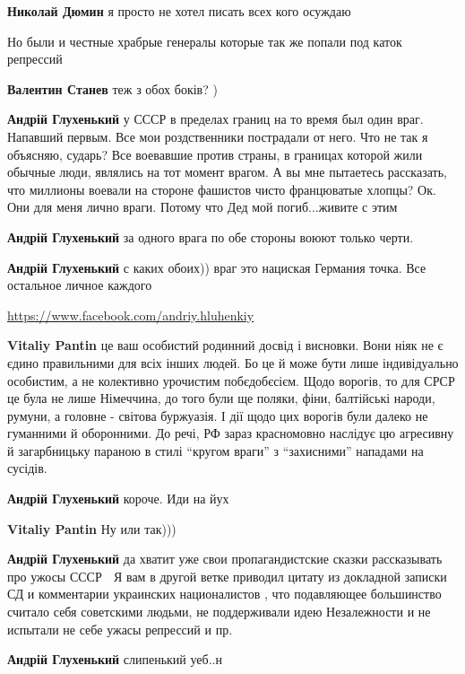\begin{itemize}
\begin{itemize}
\textbf{Николай Дюмин} я просто не хотел писать всех кого осуждаю

Но были и честные храбрые генералы которые так же попали под каток репрессий

\textbf{Валентин Станев} теж з обох боків? )

\textbf{Андрій Глухенький} у СССР в пределах границ на то время был один враг.
Напавший первым. Все мои роздственники пострадали от него. Что не так я
объясняю, сударь? Все воевавшие против страны, в границах которой жили обычные
люди, являлись на тот момент врагом. А вы мне пытаетесь рассказать, что
миллионы воевали на стороне фашистов чисто францюватые хлопцы? Ок. Они для меня
лично враги. Потому что Дед мой погиб...живите с этим

\textbf{Андрій Глухенький} за одного врага по обе стороны воюют только черти.

\textbf{Андрій Глухенький} с каких обоих)) враг это нациская Германия точка. Все остальное личное каждого

\url{https://www.facebook.com/andriy.hluhenkiy}

\textbf{Vitaliy Pantin} це ваш особистий родинний досвід і висновки. Вони ніяк
не є єдино правильними для всіх інших людей. Бо це й може бути лише
індивідуально особистим, а не колективно урочистим побєдобєсієм. Щодо ворогів,
то для СРСР це була не лише Німеччина, до того були ще поляки, фіни, балтійські
народи, румуни, а головне - світова буржуазія. І дії щодо цих ворогів були
далеко не гуманними й оборонними. До речі, РФ зараз красномовно наслідує цю
агресивну й загарбницьку параною в стилі \enquote{кругом враги} з
\enquote{захисними} нападами на сусідів.

\textbf{Андрій Глухенький} короче. Иди на йух

\textbf{Vitaliy Pantin} Ну или так)))

\textbf{Андрій Глухенький} да хватит уже свои пропагандистские сказки
рассказывать про ужосы СССР 🙂 Я вам в другой ветке приводил цитату из
докладной записки СД и комментарии украинских националистов , что подавляющее
большинство считало себя советскими людьми, не поддерживали идею Незалежности и
не испытали не себе ужасы репрессий и пр.

\textbf{Андрій Глухенький} слипенький уеб..н


\end{itemize}
\end{itemize}
